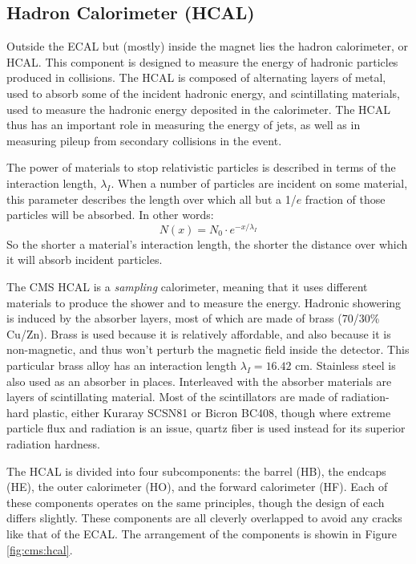\subsection{Hadron Calorimeter (HCAL)}
\label{ssec:cms:components:hcal}

Outside the ECAL but (mostly) inside the magnet lies the hadron
calorimeter, or HCAL. This component is designed to measure the energy
of hadronic particles produced in collisions. The HCAL is composed of
alternating layers of metal, used to absorb some of the incident
hadronic energy, and scintillating materials, used to measure the
hadronic energy deposited in the calorimeter. The HCAL thus has an
important role in measuring the energy of jets, as well as in
measuring pileup from secondary collisions in the event.

The power of materials to stop relativistic particles is described in
terms of the interaction length, $\lambda_I$. When a number of
particles are incident on some material, this parameter describes
the length over which all but a 1/$e$ fraction of those particles will
be absorbed. In other words:
\begin{equation}
\label{eq:cms:hcal:intlength}
N(x) = N_0 \cdot e^{-x/\lambda_I}
\end{equation}
So the shorter a material's interaction length, the shorter the
distance over which it will absorb incident particles.

The CMS HCAL is a \emph{sampling} calorimeter, meaning that it uses
different materials to produce the shower and to measure the
energy. Hadronic showering is induced by the absorber layers, most of
which are made of brass (70/30\% Cu/Zn). Brass
is used because it is relatively affordable, and also because it is
non-magnetic, and thus won't perturb the magnetic field inside the
detector. This particular brass alloy has an interaction length
$\lambda_I = 16.42$ cm. Stainless steel is also used as an absorber in places.
Interleaved with the absorber materials are layers of
scintillating material. Most of the scintillators are made of
radiation-hard plastic, either Kuraray SCSN81 or Bicron BC408, though
where extreme particle flux and radiation is an issue, quartz fiber is
used instead for its superior radiation hardness.

The HCAL is divided into four subcomponents: the barrel (HB), the
endcaps (HE), the outer calorimeter (HO), and the forward calorimeter
(HF). Each of these components operates on the same principles, though
the design of each differs slightly. These components are all cleverly
overlapped to avoid any cracks like that of the ECAL. The arrangement
of the components is showin in Figure \ref{fig:cms:hcal}.

